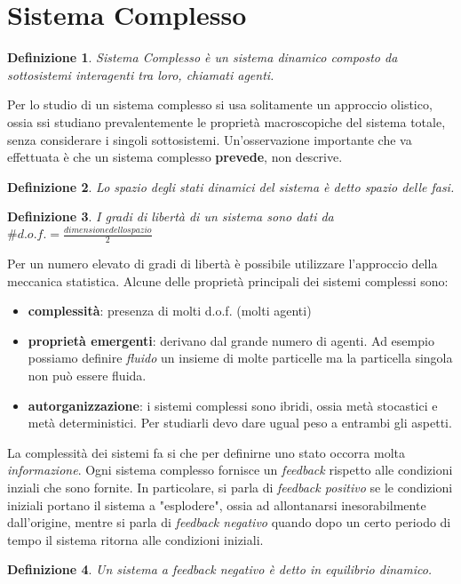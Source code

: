 \documentclass[12pt, a4paper]{book}
\theoremstyle{theorem}
\newtheorem{definition}{Definizione}[section]
\begin{document}
		\section{Sistema Complesso}
			\begin{definition}
				\textit{Sistema Complesso} è un sistema dinamico composto da sottosistemi interagenti tra loro, chiamati agenti.
			\end{definition}
			Per lo studio di un sistema complesso si usa solitamente un approccio olistico, ossia ssi studiano prevalentemente le proprietà macroscopiche del sistema totale, senza considerare i singoli sottosistemi.
			Un'osservazione importante che va effettuata è che un sistema complesso \textbf{prevede}, non descrive.
			\begin{definition}
				Lo spazio degli stati dinamici del sistema è detto spazio delle fasi.
			\end{definition}
			\begin{definition}
				I gradi di libertà di un sistema sono dati da $\# d.o.f.=\frac{dimensione dello spazio}{2}$
			\end{definition}
			Per un numero elevato di gradi di libertà è possibile utilizzare l'approccio della meccanica statistica.
			Alcune delle proprietà principali dei sistemi complessi sono:
			\begin{itemize}
				\item \textbf{complessità}: presenza di molti d.o.f. (molti agenti)
				\item \textbf{proprietà emergenti}: derivano dal grande numero di agenti. Ad esempio possiamo definire \textit{fluido} un insieme di molte particelle ma la particella singola non può essere fluida.
				\item \textbf{autorganizzazione}: i sistemi complessi sono ibridi, ossia metà stocastici e metà deterministici. Per studiarli devo dare ugual peso a entrambi gli aspetti.
			\end{itemize}
			La complessità dei sistemi fa si che per definirne uno stato occorra molta \emph{informazione}.
			Ogni sistema complesso fornisce un \emph{feedback} rispetto alle condizioni inziali che sono fornite.
			In particolare, si parla di \emph{feedback positivo} se le condizioni iniziali portano il sistema a "esplodere", ossia ad allontanarsi inesorabilmente dall'origine, mentre si parla di \emph{feedback negativo} quando dopo un certo periodo di tempo il sistema ritorna alle condizioni iniziali.
			\begin{definition}
				Un sistema a feedback negativo è detto in equilibrio dinamico.
			\end{definition}
		
\end{document}
